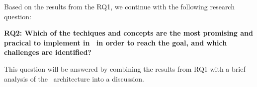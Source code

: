 Based on the results from the RQ1, we continue with the following research question:

\textbf{RQ2: Which of the techiques and concepts are the most promising and pracical to implement in \genusSoftware~in order to reach the goal, and which challenges are identified?}

This question will be answered by combining the results from RQ1 with a brief analysis of the \genusSoftware~architecture into a discussion.

%


